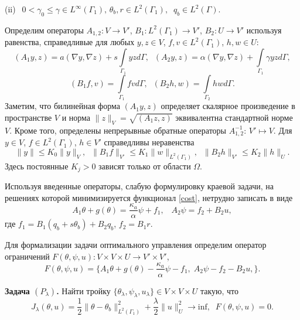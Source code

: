 \documentclass[12pt]{article}
\begin{document}
    (ii) $\;\,0<\gamma_0\leq \gamma\in L^\infty(\Gamma_1),\,\theta_b, r \in L^2(\Gamma_1),\;\; q_b\in L^2(\Gamma).$


    Определим операторы $A_{1,2}\colon V \to V'$, $B_1\colon L^2(\Gamma_1)\to V'$,
    $B_2\colon U\to V'$ используя
    равенства, справедливые для любых $y,z \in V$, $f,v\in L^2(\Gamma_1)$,
    $h,w\in U$:
    \[
        (A_1y,z) =a (\nabla y, \nabla z) +
        s\int\limits_{\Gamma_1}yz d\Gamma, \;\;
        (A_2y,z) =\alpha (\nabla y, \nabla z) +
        \int\limits_{\Gamma_1}\gamma yz d\Gamma,
    \]
    $$
    (B_1f, v)
    = \int\limits_{\Gamma_1}fv d\Gamma,\;\; (B_2h, w)
    = \int\limits_{\Gamma_2}hw d\Gamma.
    $$
    Заметим, что
    билинейная форма $(A_1y,z)$ определяет скалярное произведение
    в пространстве $V$ и норма $\|z\|_V=\sqrt{(A_1z,z)}$ эквивалентна
    стандартной норме $V$. Кроме того, определены непрерывные обратные
    операторы
    $A_{1,2}^{-1}:\,V'\mapsto V.$ Для
    $y\in V$, $f\in L^2(\Gamma_1)$, $h\in V'$ справедливы неравенства
    \begin{equation}
        \label{E}
        \|y\|\leq K_0\|y\|_V,\; \; \|B_1f\|_{V'}\leq K_1\|w\|_{L^2(\Gamma_1)},
        \;\;
        \|B_2 h\|_{V'}\leq K_2\|h\|_{U}.
    \end{equation}
    Здесь постоянные $K_j>0$ зависят только от области $\Omega.$

    Используя введенные операторы, слабую формулировку краевой задачи, на решениях которой минимизируется функционал \eqref{cost}, нетрудно записать в виде
    \begin{equation}
        \label{CS}
        A_1\theta+g(\theta)=\frac{\kappa_a}{\alpha}\psi+f_1,\;\;\; A_2\psi=f_2+B_2u,
    \end{equation}
    где $f_1=B_1(q_b+s\theta_b)+B_2q_b$, $f_2=B_1r.$

    Для формализации задачи оптимального управления
    определим оператор
    ограничений $F(\theta, \psi, u) : V \times V \times U \rightarrow V' \times V'$,
    \[
        F(\theta, \psi, u) = \{A_1\theta+g(\theta)-\frac{\kappa_a}{\alpha}\psi-f_1 ,\;
        A_2\psi-f_2-B_2u, \}.
    \]


    \textbf{Задача $(P_\lambda)$.} Найти тройку $\{\theta_\lambda, \psi_\lambda, u_\lambda \} \in V \times V \times U$
    такую, что
    \begin{equation}
        \label{CP}
        J_\lambda(\theta, u) = \frac{1}{2}\|\theta -\theta_b\|^2_{L^2(\Gamma_1)}
        + \frac{\lambda}{2}\|u\|^2_U \rightarrow \text{inf},\;\; F(\theta, \psi, u)=0.
    \end{equation}
\end{document}
